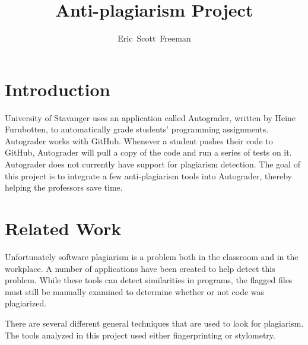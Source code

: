 \documentclass[10pt,journal,compsoc]{IEEEtran}
\begin{document}
	\title{Anti-plagiarism Project}
	\author{Eric~Scott~Freeman}
	
	
	\maketitle
	
	\IEEEdisplaynontitleabstractindextext
	\IEEEpeerreviewmaketitle

	\ifCLASSOPTIONcompsoc
	\else
		\section{Introduction}
		\label{sec:introduction}
	\fi
	
	 University of Stavanger uses an application called Autograder, written by Heine Furubotten, to automatically grade students' programming assignments. Autograder works with GitHub. Whenever a student pushes their code to GitHub, Autograder will pull a copy of the code and run a series of tests on it. Autograder does not currently have support for plagiarism detection. The goal of this project is to integrate a few anti-plagiarism tools into Autograder, thereby helping the professors save time.

	\section{Related Work}
	Unfortunately software plagiarism is a problem both in the classroom and in the workplace. A number of applications have been created to help detect this problem. While these tools can detect similarities in programs, the flagged files must still be manually examined to determine whether or not code was plagiarized.
		
	There are several different general techniques that are used to look for plagiarism. The tools analyzed in this project used either fingerprinting or stylometry.
		
\end{document}
